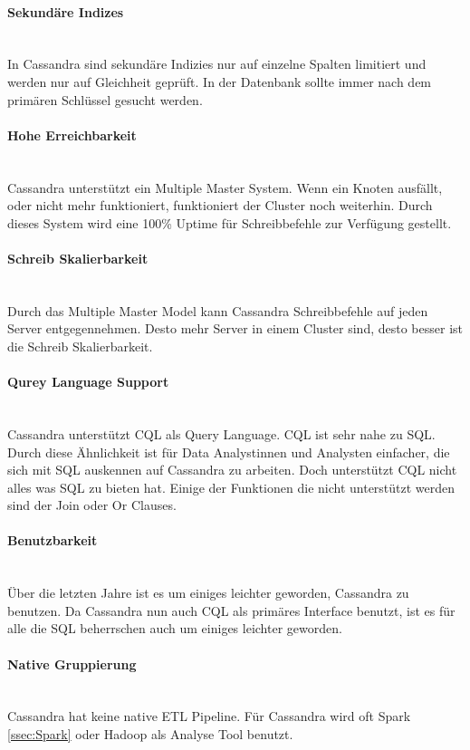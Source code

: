 \paragraph{Sekundäre Indizes}\mbox{} \\
In Cassandra sind sekundäre Indizies nur auf einzelne Spalten limitiert und werden nur auf Gleichheit geprüft. In der Datenbank sollte immer nach dem primären Schlüssel gesucht werden.
\paragraph{Hohe Erreichbarkeit}\mbox{} \\
Cassandra unterstützt ein Multiple Master System. Wenn ein Knoten ausfällt, oder nicht mehr funktioniert, funktioniert der Cluster noch weiterhin. Durch dieses System wird eine 100\% Uptime für Schreibbefehle zur Verfügung gestellt. 
\paragraph{Schreib Skalierbarkeit}\mbox{} \\
Durch das Multiple Master Model kann Cassandra Schreibbefehle auf jeden Server entgegennehmen. Desto mehr Server in einem Cluster sind, desto besser ist die Schreib Skalierbarkeit.
\paragraph{Qurey Language Support}\mbox{} \\
Cassandra unterstützt CQL als Query Language. CQL ist sehr nahe zu SQL. Durch diese Ähnlichkeit ist für Data Analystinnen und Analysten einfacher, die sich mit SQL auskennen auf Cassandra zu arbeiten. Doch unterstützt CQL nicht alles was SQL zu bieten hat. Einige der Funktionen die nicht unterstützt werden sind der Join oder Or Clauses. 
\paragraph{Benutzbarkeit}\mbox{} \\
Über die letzten Jahre ist es um einiges leichter geworden, Cassandra zu benutzen. Da Cassandra nun auch CQL als primäres Interface benutzt, ist es für alle die SQL beherrschen auch um einiges leichter geworden.
\paragraph{Native Gruppierung}\mbox{} \\
Cassandra hat keine native ETL Pipeline. Für Cassandra wird oft Spark \ref{ssec:Spark} oder Hadoop als Analyse Tool benutzt.
